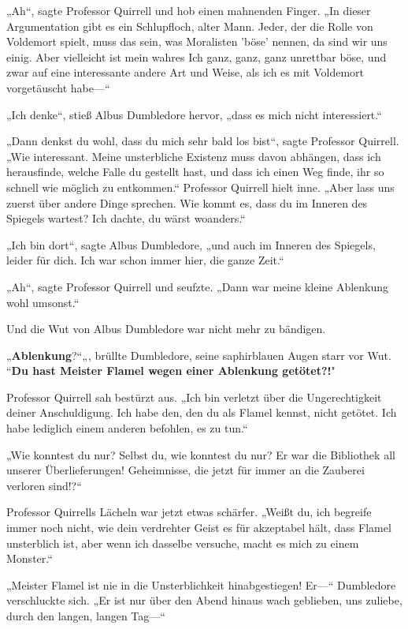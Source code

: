 {„Ah“, sagte Professor Quirrell und hob einen mahnenden Finger. „In dieser Argumentation gibt es ein Schlupfloch, alter Mann. Jeder, der die Rolle von Voldemort spielt, muss das sein, was Moralisten 'böse' nennen, da sind wir uns einig. Aber vielleicht ist mein wahres Ich ganz, ganz, ganz unrettbar böse, und zwar auf eine interessante andere Art und Weise, als ich es mit Voldemort vorgetäuscht habe—“

„Ich denke“, stieß Albus Dumbledore hervor, „dass es mich nicht interessiert.“

„Dann denkst du wohl, dass du mich sehr bald los bist“, sagte Professor Quirrell. „Wie interessant. Meine unsterbliche Existenz muss davon abhängen, dass ich herausfinde, welche Falle du gestellt hast, und dass ich einen Weg finde, ihr so schnell wie möglich zu entkommen.“ Professor Quirrell hielt inne. „Aber lass uns zuerst über andere Dinge sprechen. Wie kommt es, dass du im Inneren des Spiegels wartest? Ich dachte, du wärst woanders.“

„Ich bin dort“, sagte Albus Dumbledore, „und auch im Inneren des Spiegels, leider für dich. Ich war schon immer hier, die ganze Zeit.“

„Ah“, sagte Professor Quirrell und seufzte. „Dann war meine kleine Ablenkung wohl umsonst.“

Und die Wut von Albus Dumbledore war nicht mehr zu bändigen.

„\textbf{Ablenkung}?“„, brüllte Dumbledore, seine saphirblauen Augen starr vor Wut. “\textbf{Du hast Meister Flamel wegen einer Ablenkung getötet?!}"

Professor Quirrell sah bestürzt aus. „Ich bin verletzt über die Ungerechtigkeit deiner Anschuldigung. Ich habe den, den du als Flamel kennst, nicht getötet. Ich habe lediglich einem anderen befohlen, es zu tun.“

„Wie konntest du nur? Selbst du, wie konntest du nur? Er war die Bibliothek all unserer Überlieferungen! Geheimnisse, die jetzt für immer an die Zauberei verloren sind!?“

Professor Quirrells Lächeln war jetzt etwas schärfer. „Weißt du, ich begreife immer noch nicht, wie dein verdrehter Geist es für akzeptabel hält, dass Flamel unsterblich ist, aber wenn ich dasselbe versuche, macht es mich zu einem Monster.“

„Meister Flamel ist nie in die Unsterblichkeit hinabgestiegen! Er—“ Dumbledore verschluckte sich. „Er ist nur über den Abend hinaus wach geblieben, uns zuliebe, durch den langen, langen Tag—“

}
